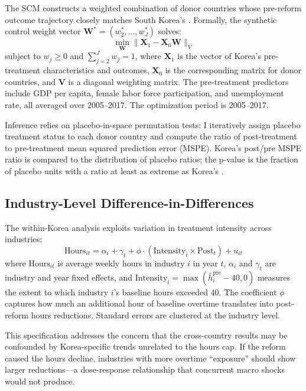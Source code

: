 \documentclass[12pt]{article}
\begin{document}
The SCM constructs a weighted combination of donor countries whose pre-reform outcome trajectory closely matches South Korea's \citep{abadie2003economic, abadie2010synthetic, abadie2015comparative}. Formally, the synthetic control weight vector $\mathbf{W}^* = (w_2^*, \ldots, w_J^*)$ solves:
\begin{equation}
\min_{\mathbf{W}} \| \mathbf{X}_1 - \mathbf{X}_0 \mathbf{W} \|_V
\end{equation}
subject to $w_j \geq 0$ and $\sum_{j=2}^{J} w_j = 1$, where $\mathbf{X}_1$ is the vector of Korea's pre-treatment characteristics and outcomes, $\mathbf{X}_0$ is the corresponding matrix for donor countries, and $\mathbf{V}$ is a diagonal weighting matrix. The pre-treatment predictors include GDP per capita, female labor force participation, and unemployment rate, all averaged over 2005--2017. The optimization period is 2005--2017.

Inference relies on placebo-in-space permutation tests: I iteratively assign placebo treatment status to each donor country and compute the ratio of post-treatment to pre-treatment mean squared prediction error (MSPE). Korea's post/pre MSPE ratio is compared to the distribution of placebo ratios; the p-value is the fraction of placebo units with a ratio at least as extreme as Korea's \citep{abadie2010synthetic}.

\subsection{Industry-Level Difference-in-Differences}

The within-Korea analysis exploits variation in treatment intensity across industries:
\begin{equation}
\text{Hours}_{it} = \alpha_i + \gamma_t + \phi \cdot (\text{Intensity}_i \times \text{Post}_t) + u_{it}
\label{eq:industry}
\end{equation}
where $\text{Hours}_{it}$ is average weekly hours in industry $i$ in year $t$, $\alpha_i$ and $\gamma_t$ are industry and year fixed effects, and $\text{Intensity}_i = \max(\bar{h}_i^{\text{pre}} - 40, 0)$ measures the extent to which industry $i$'s baseline hours exceeded 40. The coefficient $\phi$ captures how much an additional hour of baseline overtime translates into post-reform hours reductions. Standard errors are clustered at the industry level.

This specification addresses the concern that the cross-country results may be confounded by Korea-specific trends unrelated to the hours cap. If the reform caused the hours decline, industries with more overtime ``exposure'' should show larger reductions---a dose-response relationship that concurrent macro shocks would not produce.
\end{document}
